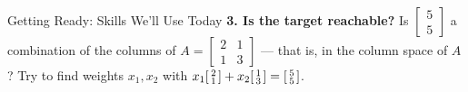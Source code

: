 \documentclass[10pt]{article}
\begin{document}
\begin{notesbox}{Getting Ready: Skills We'll Use Today}
\vspace{4pt}
\textbf{3. Is the target reachable?} Is $\begin{bmatrix} 5 \\ 5 \end{bmatrix}$ a combination of
the columns of $A=\begin{bmatrix} 2 & 1 \\ 1 & 3 \end{bmatrix}$ --- that is, in the column space of
$A$? Try to find weights $x_1,x_2$ with
$x_1\begin{bsmallmatrix} 2\\1 \end{bsmallmatrix}+x_2\begin{bsmallmatrix} 1\\3 \end{bsmallmatrix}=\begin{bsmallmatrix} 5\\5 \end{bsmallmatrix}$.
\writeline
\end{notesbox}
\end{document}
